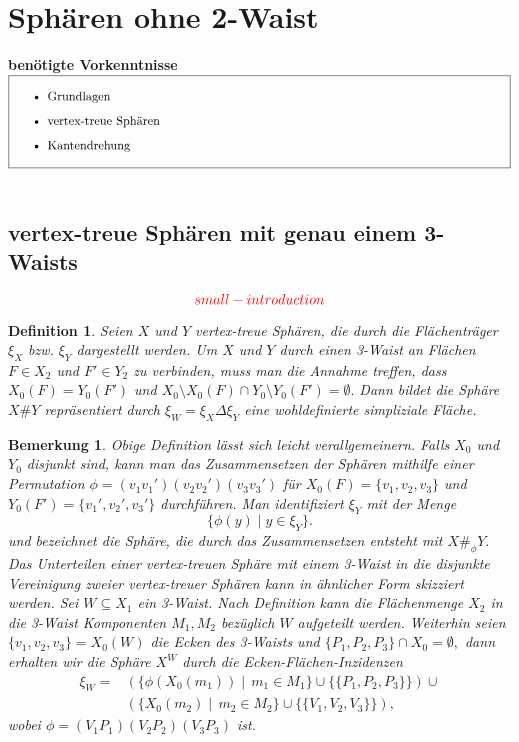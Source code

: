 \documentclass[12pt,titlepage,twoside,cleardoublepage]{article}
\theoremstyle{nummermitklammern}
\newtheorem{definition}[temp]{Definition}
\newtheorem{bemerkung}[temp]{Bemerkung}
\newtheorem{definition}[zahl]{Definition}
\newtheorem{bemerkung}[zahl]{Bemerkung}
\numberwithin{equation}{section}
\begin{document}
 \section{Sphären ohne 2-Waist}
 \textbf{benötigte Vorkenntnisse}\\
$\fbox{
\parbox{14cm}{\begin{itemize}
\item Grundlagen 
\item vertex-treue Sph\"aren
\item Kantendrehung
\end{itemize}
}}$\\\\

\subsection{vertex-treue Sphären mit genau einem 3-Waists}
\[
\textcolor{red}{small-introduction}
\]
\begin{definition}
Seien $X$ und $Y$ vertex-treue Sphären, die durch die Flächenträger $\xi_X$ bzw. $\xi_Y$ dargestellt werden. Um $X$ und $Y$ durch einen 3-Waist an Flächen $F\in X_2$ und $F'\in Y_2$ zu verbinden, muss man die Annahme treffen, dass
$X_0(F)=Y_0(F')$ und $X_0\setminus X_0(F)\cap Y_0\setminus Y_0(F')=\emptyset.$ Dann bildet die Sphäre $X\#Y$ repräsentiert durch $\xi_W=\xi_X \Delta \xi_Y$ eine wohldefinierte simpliziale Fläche.
\end{definition}
\begin{bemerkung}
Obige Definition lässt sich leicht verallgemeinern. Falls $X_0$ und $Y_0$ disjunkt sind, kann man das Zusammensetzen der Sphären mithilfe einer Permutation $\phi=(v_1v_1')(v_2v_2')(v_3v_3')$ für $X_0(F)=\{v_1,v_2,v_3\}$ und $Y_0(F')=\{v_1',v_2',v_3'\}$ durchführen. Man identifiziert $\xi_Y$ mit der Menge  
\[
\{\phi (y)\mid y\in \xi_Y \}.
\]
und bezeichnet die Sphäre, die durch das Zusammensetzen  entsteht mit $X\#_{\phi}Y.$\\
Das Unterteilen einer vertex-treuen Sphäre mit einem 3-Waist in die disjunkte Vereinigung zweier vertex-treuer Sphären kann in ähnlicher Form skizziert werden. Sei $W\subseteq X_1$ ein 3-Waist. Nach Definition  kann die Flächenmenge $X_2$ in die 3-Waist Komponenten $M_1,M_2$ bezüglich $W$ aufgeteilt werden. Weiterhin seien $\{v_1,v_2,v_3\}=X_0(W)$ die Ecken des 3-Waists und $\{P_1,P_2,P_3\}\cap X_0=\emptyset,$ dann erhalten wir die Sphäre $X^W$ durch die Ecken-Flächen-Inzidenzen 
\begin{align*}
\xi_W=&(\{\phi(X_0(m_1))\mid \, m_1\in M_1\}\cup \{\{P_1,P_2,P_3\}\}) \cup\\
 &(\{X_0(m_2)\mid \, m_2\in M_2\}\cup \{\{V_1,V_2,V_3\}\}),
\end{align*}
wobei $\phi=(V_1P_1)(V_2P_2)(V_3P_3)$ ist.
\end{bemerkung}
\end{document}
